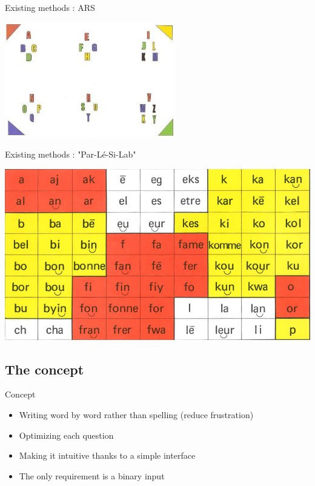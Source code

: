 \documentclass[graphics]{beamer}
\begin{document}
\begin{frame}{Existing methods : ARS}
	\begin{center}
		\includegraphics[scale=0.9]{tableau_lettres_transparent}
	\end{center}
\end{frame}

\begin{frame}{Existing methods : "Par-Lé-Si-Lab"}
	\begin{center}
		\includegraphics[scale=0.3]{parler_syllabes}
	\end{center}
\end{frame}

\subsection{The concept}
\begin{frame}{Concept}
	\begin{center}
		\begin{itemize}
			\item Writing word by word rather than spelling (reduce frustration)
			\item Optimizing each question
			\item Making it intuitive thanks to a simple interface
			\item The only requirement is a binary input
		\end{itemize}
	\end{center}
\end{frame}
\end{document}
